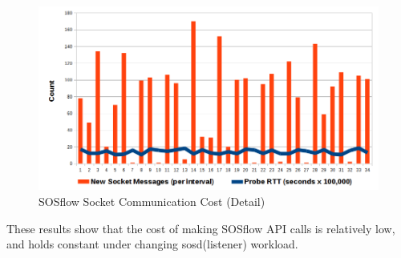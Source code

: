 \begin{figure}[h]
\centering
\includegraphics[width=\columnwidth]{images/icebox_api_cost_zoom.png}
\caption{SOSflow Socket Communication Cost (Detail)}
\label{sock_cost_detail}
\end{figure}
%
\par
%
These results show that the cost of making SOSflow API calls is
relatively low, and holds constant under changing sosd(listener)
workload.
%
%





